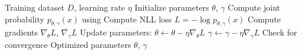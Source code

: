 \begin{algorithm}[H]
\caption{Training Process of the Born Machine}
\label{alg:train}
\begin{algorithmic}
\REQUIRE Training dataset $D$, learning rate $\eta$
\STATE Initialize parameters $\theta$, $\gamma$
        \STATE Compute joint probability $p_{\theta,\gamma}(x)$ using 
        \STATE Compute NLL loss $L = -\log p_{\theta,\gamma}(x)$
        \STATE Compute gradients $\nabla_{\theta} L$, $\nabla_{\gamma} L$
        \STATE Update parameters:
        \STATE $\theta \leftarrow \theta - \eta \nabla_{\theta} L$
        \STATE $\gamma \leftarrow \gamma - \eta \nabla_{\gamma} L$
    \ENDFOR
    \STATE Check for convergence
\ENDWHILE
\ENSURE Optimized parameters $\theta$, $\gamma$
\end{algorithmic}
\end{algorithm}




